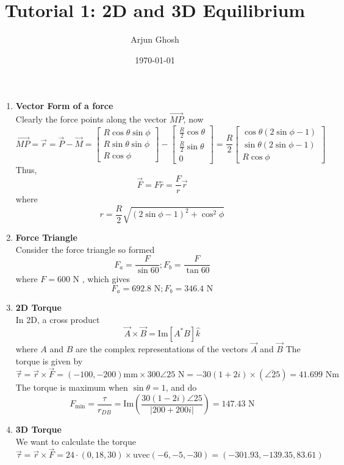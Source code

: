 \documentclass[12pt]{article}
\title{Tutorial 1: 2D and 3D Equilibrium}
\author{Arjun Ghosh}
\date{\today}
\begin{document}
\maketitle

\begin{enumerate}
\item \textbf{Vector Form of a force} \\
Clearly the force points along the vector $\vec{MP}$, now
$$
\vec{MP} = \vec{r} = \vec{P} -\vec{M} = \begin{bmatrix}
R \cos \theta \sin \phi \\
R \sin \theta \sin \phi \\
R \cos \phi
\end{bmatrix} 
-
\begin{bmatrix}
\frac{R}{2}\cos \theta \\
\frac{R}{2} \sin \theta \\
0
\end{bmatrix} = 
\frac{R}{2}
\begin{bmatrix}
\cos \theta \left( 2\sin \phi -1 \right) \\
\sin \theta \left( 2 \sin \phi -1 \right) \\ 
R \cos \phi
\end{bmatrix}
$$
Thus, 
$$
\vec{F} = F \hat{r} = \frac{F}{r}\vec{r}
$$
where 
$$
r = \frac{R}{2} \sqrt{ (2\sin \phi -1)^{2} + \cos ^{2} \phi } 
$$
\item \textbf{Force Triangle} \\
Consider the force triangle so formed
$$
F_{a} = \frac{F}{\sin 60}; F_{b} = \frac{F}{\tan 60}
$$
where $F = 600 \text{ N}$ , which gives
$$
F_{a} = 692.8 \text{ N}; F_{b} = 346.4 \text{ N}
$$
\item \textbf{2D Torque} \\
In 2D, a cross product
$$
\vec{A} \times \vec{B} = \mathrm{Im} [A^{*}B] \hat{k}
$$
where $A$ and $B$ are the complex representations of the vectors $\vec{A}$ and $\vec{B}$
The torque is given by
$$
\vec{\tau} = \vec{r} \times \vec{F}  = (-100, -200)\text{mm} \times 300 \angle 25\text{ N} = -30 (1 + 2i)\times(\bar{\angle 25}) = 41.699 \text{ Nm}
$$
The torque is maximum when $\sin \theta = 1$,  and do
$$
F_{\text{min}} = \frac{\tau}{r_{DB}} =\mathrm{Im}\left(  \frac{30(1 -2i)\angle25}{|200 + 200i|} \right) = 147.43 \text{ N}
$$
\item \textbf{3D Torque} \\
We want to calculate the torque
$$
\vec{\tau} = \vec{r} \times \vec{F} = 24\cdot(0,18,30)\times \text{uvec}(-6, -5, -30) = (-301.93, -139.35, 83.61)
$$
\end{enumerate}
\end{document}
